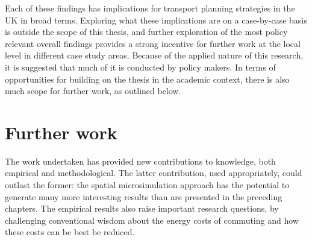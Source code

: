 Each of these findings has implications for transport planning strategies
in the UK in broad terms. Exploring what these implications are on a
case-by-case basis is outside the scope of this thesis, and further exploration
of the most policy relevant overall findings provides a strong
incentive for further work at the local level in different case study areas.
Because of the applied nature of this research, it is suggested that much of
it is conducted by policy makers. In terms of opportunities for
building on the thesis in the academic context, there is also much scope for further
work, as outlined below.

\section{Further work} \label{sfurther}
The work undertaken has provided new contributions to knowledge, both empirical
and methodological. The latter contribution, used appropriately,
could outlast the former: the spatial microsimulation approach has the potential
to generate many more interesting results than are presented in the preceding
chapters. The empirical results also raise important research questions, by
challenging conventional wisdom about the energy costs of commuting and how
these costs can be best be reduced.

